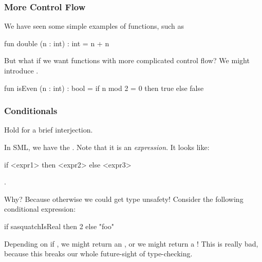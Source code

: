 \documentclass[aspectratio=169]{beamer}
\begin{document}
\begin{frame}[fragile]
  \frametitle{More Control Flow}

  We have seen some simple examples of
  functions, such as
  \begin{codeblock}
    fun double (n : int) : int = n + n
  \end{codeblock}

  \pause
  \vspace{\fill}

  But what if we want functions with more complicated control flow? We might introduce 
  .

  \begin{codeblock}
    fun isEven (n : int) : bool =
      if n mod 2 = 0 then true 
      else false 
  \end{codeblock}

  \pause
  \vspace{\fill}

\end{frame}

\begin{frame}[fragile]
  \frametitle{Conditionals}

  Hold for a brief interjection.

  \pause
  \vspace{\fill}

  In SML, we have the . Note that it is an \textit{expression}. It looks like:
  \begin{codeblock}
    if <expr1> then <expr2> else <expr3>
  \end{codeblock}

  \pause
  \vspace{\fill}

  .

  \pause
  \vspace{\fill}

  Why? Because otherwise we could get type unsafety! Consider the following conditional
  expression:
  \begin{codeblock}
    if sasquatchIsReal then 2 else "foo"
  \end{codeblock}

  \pause
  \vspace{\fill}

  Depending on if , we might return an , or we might return
  a ! This is really bad, because this breaks our whole future-sight of 
  type-checking.
\end{frame}
\end{document}
